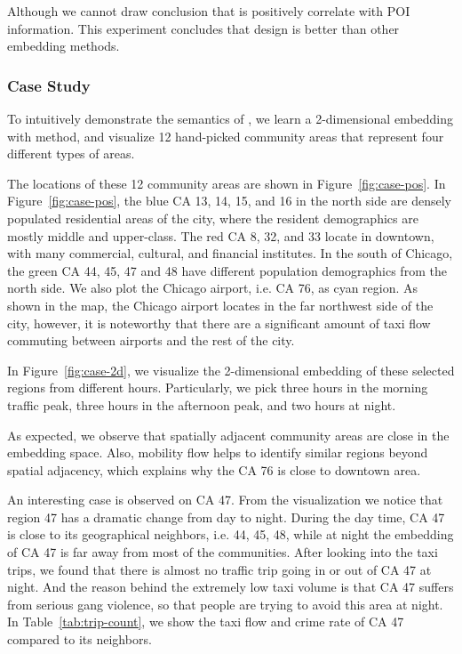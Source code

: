 Although we cannot draw conclusion that \hdge is positively correlate with POI information. This experiment concludes that \hdge design is better than other embedding methods.








\subsubsection{Case Study}


To intuitively demonstrate the semantics of \hdge, we learn a 2-dimensional embedding with \hdge method, and visualize 12 hand-picked community areas that represent four different types of areas.

The locations of these 12 community areas are shown in Figure~\ref{fig:case-pos}. In Figure~\ref{fig:case-pos}, the blue CA 13, 14, 15, and 16 in the north side are densely populated residential areas of the city, where the resident demographics are mostly middle and upper-class. The red CA 8, 32, and 33 locate in downtown, with many commercial, cultural, and financial institutes. In the south of Chicago, the green CA 44, 45, 47 and 48 have different population demographics from the north side. We also plot the Chicago airport, i.e. CA 76, as cyan region. As shown in the map, the Chicago airport locates in the far northwest side of the city, however, it is noteworthy that there are a significant amount of taxi flow commuting between airports and the rest of the city.


In Figure~\ref{fig:case-2d}, we visualize the 2-dimensional embedding of these selected regions from different hours. Particularly, we pick three hours in the morning traffic peak, three hours in the afternoon peak, and two hours at night. 

As expected, we observe that spatially adjacent community areas are close in the \hdge embedding space. Also, mobility flow helps to identify similar regions beyond spatial adjacency, which explains why the CA 76 is close to downtown area.



An interesting case is observed on CA 47. From the visualization we notice that region 47 has a dramatic change from day to night. During the day time, CA 47 is close to its geographical neighbors, i.e. 44, 45, 48, while at night the embedding of CA 47 is far away from most of the communities. After looking into the taxi trips, we found that there is almost no traffic trip going in or out of CA 47 at night. And the reason behind the extremely low taxi volume is that CA 47 suffers from serious gang violence, so that people are trying to avoid this area at night. In Table~\ref{tab:trip-count}, we show the taxi flow and crime rate of CA 47 compared to its neighbors.




